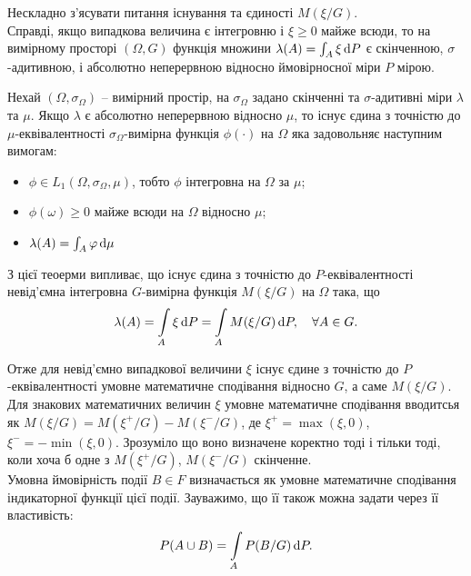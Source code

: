 Нескладно з'ясувати питання існування та єдиності $M(\xi / G)$. \\

Справді, якщо випадкова величина є інтегровню і $\xi \ge 0$ майже всюди, то на вимірному просторі $(\Omega, G)$ функція множини $\lambda(A) = \int_A \xi \mathop{}\!\mathrm{d} P$ є скінченною, $\sigma$-адитивною, і абсолютно неперервною відносно ймовірносної міри $P$ мірою.

\begin{theorem}
    Нехай $(\Omega, \sigma_\Omega)$ -- вимірний простір, на $\sigma_\Omega$ задано скінченні та $\sigma$-адитивні міри $\lambda$ та $\mu$. Якщо $\lambda$ є абсолютно неперервною відносно $\mu$, то існує єдина з точністю до $\mu$-еквівалентності $\sigma_\Omega$-вимірна функція $\phi(\cdot)$ на $\Omega$ яка задовольняє наступним вимогам:
    \begin{itemize}
        \item $\phi \in L_1(\Omega, \sigma_\Omega, \mu)$, тобто $\phi$ інтегровна на $\Omega$ за $\mu$;
        \item $\phi(\omega) \ge 0$ майже всюди на $\Omega$ відносно $\mu$;
        \item $\lambda(A) = \int_A \varphi \mathop{}\!\mathrm{d} \mu$
    \end{itemize}
\end{theorem}

З цієї теоерми випливає, що існує єдина з точністю до $P$-еквівалентності невід'ємна інтегровна $G$-вимірна функція $M(\xi / G)$ на $\Omega$ така, що \[ \lambda(A) = \displaystyle\int\limits_A \xi \mathop{}\!\mathrm{d} P = \displaystyle\int\limits_A M(\xi / G) \mathop{}\!\mathrm{d} P, \quad \forall A \in G. \]

Отже для невід'ємно випадкової величини $\xi$ існує єдине з точністю до $P$-еквівалентності умовне математичне сподівання відносно $G$, а саме $M(\xi / G)$. \\

Для знакових математичних величин $\xi$ умовне математичне сподівання вводитсья як $M(\xi / G) = M(\xi^+ / G) - M(\xi^- / G)$, де $\xi^+ = \max(\xi, 0)$, $\xi^- = - \min(\xi, 0)$. Зрозуміло що воно визначене коректно тоді і тільки тоді, коли хоча б одне з $ M(\xi^+ / G)$, $M(\xi^- / G)$ скінченне. \\

Умовна ймовірність події $B \in F$ визначається як умовне математичне сподівання індикаторної функції цієї події. Зауважимо, що її також можна задати через її властивість: \[ P(A \cup B) = \displaystyle\int\limits_A P(B / G) \mathop{}\!\mathrm{d} P. \] 


